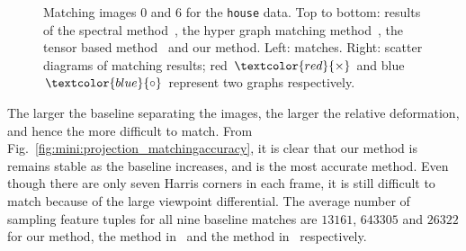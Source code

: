 \begin{figure}[!t]
        \addtocounter{subfigure}{-1}
        \begin{minipage}[b]{0.4\textwidth}
        \end{minipage}%
        \begin{minipage}[b]{0.4\textwidth}
        \end{minipage}%
        \caption{Matching images 0 and 6 for the \texttt{house} data. Top to bottom: results of the spectral method~\cite{Cour06}, the hyper graph matching method~\cite{Zass08}, the tensor based method~\cite{Duchenne_etal09} and our method. Left: matches. Right: scatter diagrams of matching results; red $\textcolor{red}{\times}$ and blue $\textcolor{blue}{\circ}$ represent two graphs respectively.}
\label{fig:mini:projection_matchingimages} %
\end{figure}%

The larger the baseline separating the images, the larger the relative deformation, and hence the more difficult to match. From Fig.~\ref{fig:mini:projection_matchingaccuracy}, it is clear that our method is remains stable as the baseline increases, and is the most accurate method. Even though there are only seven Harris corners in each frame, it is still difficult to match because of the large viewpoint differential. The average number of sampling feature tuples for all nine baseline matches are $13161$, $643305$ and $26322$ for our method, the method in~\cite{Duchenne_etal09} and  the method in~\cite{Zass08} respectively.
